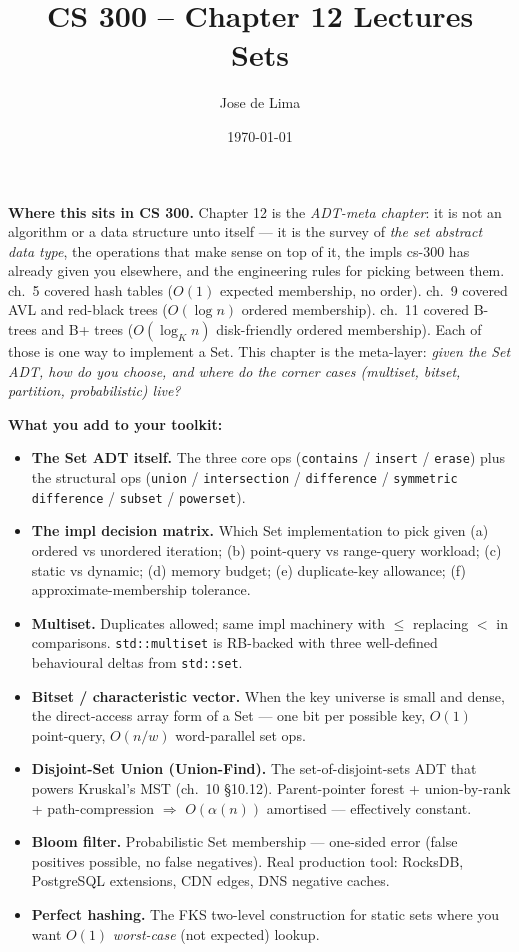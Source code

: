 \documentclass[11pt]{article}
\title{CS 300 -- Chapter 12 Lectures\\\large Sets}
\author{Jose de Lima}
\date{\today}
\begin{document}
\maketitle

\begin{ideabox}
\textbf{Where this sits in CS 300.} Chapter 12 is the
\emph{ADT-meta chapter}: it is not an algorithm or a data structure
unto itself --- it is the survey of \emph{the set abstract data
type}, the operations that make sense on top of it, the impls cs-300
has already given you elsewhere, and the engineering rules for
picking between them. ch.~5 covered hash tables ($O(1)$ expected
membership, no order). ch.~9 covered AVL and red-black trees
($O(\log n)$ ordered membership). ch.~11 covered B-trees and B+
trees ($O(\log_K n)$ disk-friendly ordered membership). Each of
those is one way to implement a Set. This chapter is the meta-layer:
\emph{given the Set ADT, how do you choose, and where do the corner
cases (multiset, bitset, partition, probabilistic) live?}

\textbf{What you add to your toolkit:}
\begin{itemize}
    \item \textbf{The Set ADT itself.} The three core ops
          (\texttt{contains} / \texttt{insert} / \texttt{erase}) plus
          the structural ops (\texttt{union} / \texttt{intersection}
          / \texttt{difference} / \texttt{symmetric difference} /
          \texttt{subset} / \texttt{powerset}).
    \item \textbf{The impl decision matrix.} Which Set
          implementation to pick given (a) ordered vs unordered
          iteration; (b) point-query vs range-query workload;
          (c) static vs dynamic; (d) memory budget; (e)
          duplicate-key allowance; (f) approximate-membership
          tolerance.
    \item \textbf{Multiset.} Duplicates allowed; same impl
          machinery with $\le$ replacing $<$ in comparisons.
          \texttt{std::multiset} is RB-backed with three
          well-defined behavioural deltas from \texttt{std::set}.
    \item \textbf{Bitset / characteristic vector.} When the key
          universe is small and dense, the direct-access array form
          of a Set --- one bit per possible key, $O(1)$ point-query,
          $O(n / w)$ word-parallel set ops.
    \item \textbf{Disjoint-Set Union (Union-Find).} The
          set-of-disjoint-sets ADT that powers Kruskal's MST
          (ch.~10 \S10.12). Parent-pointer forest +
          union-by-rank + path-compression $\Rightarrow$
          $O(\alpha(n))$ amortised --- effectively constant.
    \item \textbf{Bloom filter.} Probabilistic Set membership ---
          one-sided error (false positives possible, no false
          negatives). Real production tool: RocksDB,
          PostgreSQL extensions, CDN edges, DNS negative caches.
    \item \textbf{Perfect hashing.} The FKS two-level construction
          for static sets where you want $O(1)$ \emph{worst-case}
          (not expected) lookup.
\end{itemize}


\end{ideabox}
\end{document}
